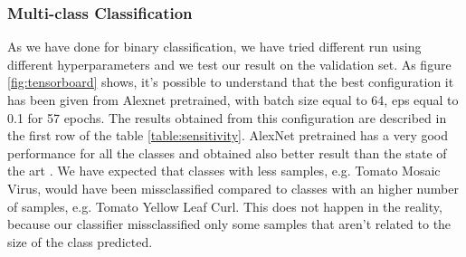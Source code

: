 \subsubsection{Multi-class Classification}
As we have done for binary classification, we have tried different run using different hyperparameters and we test our result on the validation set. As figure \ref{fig:tensorboard} shows, it's possible to understand that the best configuration it has been given from Alexnet pretrained, with batch size equal to 64, eps equal to 0.1 for 57 epochs. The results obtained from this configuration are described in the first row of the table \ref{table:sensitivity}. AlexNet pretrained has a very good performance for all the classes and obtained also better result than the state of the art \cite{ref11}. We have expected that classes with less samples, e.g. Tomato Mosaic Virus, would have been missclassified compared to classes with an higher number of samples, e.g. Tomato Yellow Leaf Curl. This does not happen in the reality, because our classifier missclassified only some samples that aren't related to the size of the class predicted.
